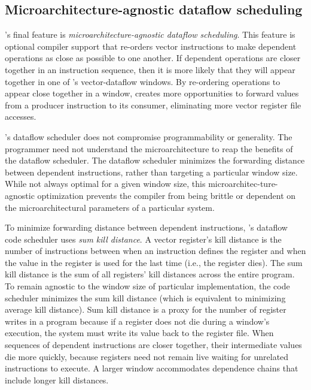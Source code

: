 \figMANICMANICb


\subsection{Microarchitecture-agnostic dataflow scheduling}
\label{manic:design:schedule}
\manic's final feature is {\em microarchitecture-agnostic
dataflow scheduling}.
%
This feature is optional compiler support that
re-orders vector instructions to make dependent operations as close as possible to one another.  If dependent operations are closer together in an instruction
sequence, then it is more likely that they will appear together in one of
\manic's vector-dataflow windows.  By re-ordering operations to appear close
together in a window, \manic creates more opportunities to
forward values from a producer instruction to its consumer,
eliminating more vector register file accesses.

\manic's dataflow scheduler does not compromise programmability or generality.
The programmer need not understand the microarchitecture to reap the benefits
of the dataflow scheduler.  The dataflow scheduler minimizes the forwarding
distance between dependent instructions, rather than targeting a particular
window size.  While not always optimal for a given window size, this
microarchitec-ture-agnostic optimization prevents the compiler from being
brittle or dependent on the microarchitectural parameters of a
particular system. 

To minimize forwarding distance between dependent instructions, \manic's
dataflow code scheduler uses {\em sum kill distance}.  A vector register's
kill distance is the number of instructions between when an instruction defines
the register and when the value in the register is used for the last time
(i.e., the register dies).  The sum kill distance is the sum of all registers'
kill distances across the entire program. To remain agnostic to the window size
of particular \manic implementation, the code
scheduler minimizes the sum kill distance (which is equivalent to minimizing
average kill distance).  Sum kill distance is a proxy for the number of
register writes in a program because if a register does not die during a
window's execution, the system must write its value back to the register file.
%
When sequences of dependent instructions are closer together, their
intermediate values die more quickly, because registers need not remain live
waiting for unrelated instructions to execute.  A larger window accommodates
dependence chains that include longer kill distances.

